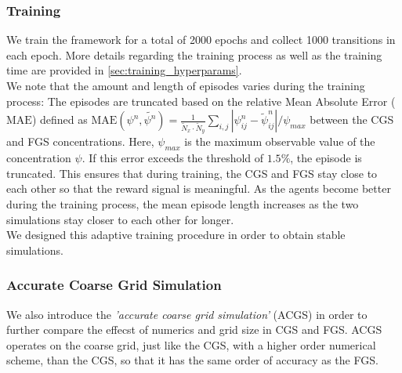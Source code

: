 \documentclass{article}
\theoremstyle{plain}
\theoremstyle{definition}
\theoremstyle{remark}
\begin{document}
\subsubsection{Training}
\label{Sec:train}
We train the framework for a total of 2000 epochs and collect 1000 transitions in each epoch. More details regarding the training process as well as the training time  are provided in \cref{sec:training_hyperparams}.\\
We note that the amount and length of episodes varies during the training process:
The episodes are truncated based on the relative Mean Absolute Error ($\text{MAE}$) defined as $\text{MAE}(  \psi^n, \tilde{ \psi^n}) = \frac{1}{\tilde N_x\cdot \tilde N_y}\sum_{i,j} |\psi^n_{ij}- \tilde{\psi}^n_{ij}| / \psi_{max}$
between the CGS and FGS concentrations. Here, $\psi_{max}$ is the maximum observable value of the concentration $\psi$. If this error exceeds the threshold of $1.5 \%$, the episode is truncated. This ensures that during training, the CGS and FGS stay close to each other so that the reward signal is meaningful. As the agents become better during the training process, the mean episode length increases as the two simulations stay closer to each other for longer.\\
We designed this adaptive training procedure in order to obtain stable simulations. 

\subsubsection{Accurate Coarse Grid Simulation}
We also introduce the \textit{'accurate coarse grid simulation'} (ACGS) in order to further compare the effecst of numerics and grid size in CGS and FGS. ACGS operates on the coarse grid, just like the CGS, with a higher order numerical scheme, than the CGS, so that it has the same order of accuracy as the FGS.
\end{document}
